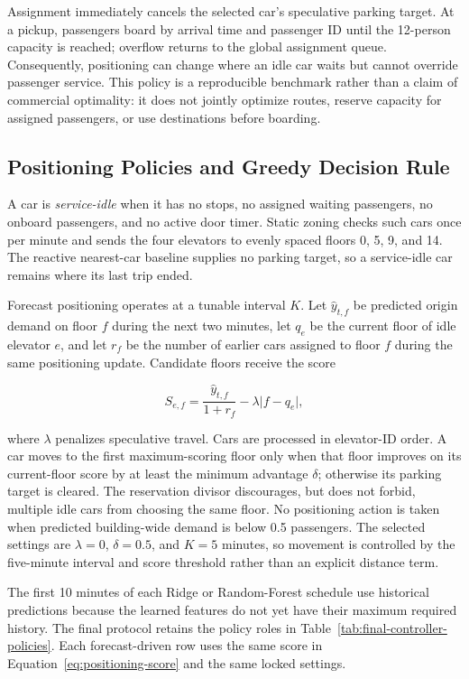 \documentclass[12pt]{article}
\begin{document}
Assignment immediately cancels the selected car's speculative parking target.
At a pickup, passengers board by arrival time and passenger ID until the
12-person capacity is reached; overflow returns to the global assignment
queue. Consequently, positioning can change where an idle car waits but cannot
override passenger service. This policy is a reproducible benchmark rather
than a claim of commercial optimality: it does not jointly optimize routes,
reserve capacity for assigned passengers, or use destinations before boarding.

\subsection{Positioning Policies and Greedy Decision Rule}

A car is \emph{service-idle} when it has no stops, no assigned waiting
passengers, no onboard passengers, and no active door timer. Static zoning
checks such cars once per minute and sends the four elevators to evenly spaced
floors 0, 5, 9, and 14. The reactive nearest-car baseline supplies no parking
target, so a service-idle car remains where its last trip ended.

Forecast positioning operates at a tunable interval $K$. Let
$\widehat{y}_{t,f}$ be predicted origin demand on floor $f$ during the next two
minutes, let $q_e$ be the current floor of idle elevator $e$, and let $r_f$ be
the number of earlier cars assigned to floor $f$ during the same positioning
update. Candidate floors receive the score

\begin{equation}
  S_{e,f}=\frac{\widehat{y}_{t,f}}{1+r_f}
    -\lambda\lvert f-q_e\rvert,
  \label{eq:positioning-score}
\end{equation}

where $\lambda$ penalizes speculative travel. Cars are processed in elevator-ID
order. A car moves to the first maximum-scoring floor only when that floor
improves on its current-floor score by at least the minimum advantage $\delta$;
otherwise its parking target is cleared. The reservation divisor discourages,
but does not forbid, multiple idle cars from choosing the same floor. No
positioning action is taken when predicted building-wide demand is below 0.5
passengers. The selected settings are $\lambda=0$, $\delta=0.5$, and $K=5$
minutes, so movement is controlled by the five-minute interval and score
threshold rather than an explicit distance term.

The first 10 minutes of each Ridge or Random-Forest schedule use historical
predictions because the learned features do not yet have their maximum required
history. The final protocol retains the policy roles in
Table~\ref{tab:final-controller-policies}. Each forecast-driven row uses the
same score in Equation~\ref{eq:positioning-score} and the same locked settings.
\end{document}
